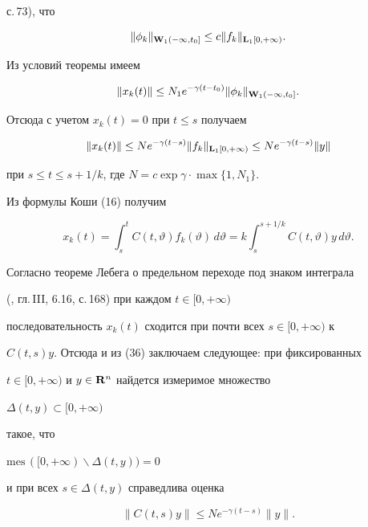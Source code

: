 с.\,73), что


$$


\|\phi_k\|_{\bold W_1(-\infty,t_0]}\le c\|f_k\|_{\bold L_1[0,+\infty)}.


$$


Из условий теоремы имеем


$$


\|x_k(t)\|\le


N_1e^{-\gamma(t-t_0)}\|\phi_k\|_{\bold W_1(-\infty,t_0]}.


$$


Отсюда с учетом $x_k(t)=0$ при $t\le s$ получаем


%


\begin{equation}


\|x_k(t)\|\le Ne^{-\gamma(t-s)}\|f_k\|_{\bold L_1[0,+\infty)}\le


Ne^{-\gamma(t-s)}\|y\|


\end{equation}


%


при $s\le t\le s+1/k$, где $N=c\exp\gamma\cdot\max\{1,N_1\}$.





Из формулы Коши (16) получим


$$


x_k(t)=\int_s^tC(t,\vartheta)f_k(\vartheta)\,d\vartheta=


k\int_s^{s+1/k}C(t,\vartheta)y\,d\vartheta.


$$


Согласно теореме Лебега о предельном переходе под знаком интеграла


(\cite{Dun}, гл.\,III, 6.16, с.\,168) при каждом $t\in[0,+\infty)$


последовательность $x_k(t)$ сходится при почти всех $s\in[0,+\infty)$ к


$C(t,s)y$. Отсюда и из (36) заключаем следующее: при фиксированных


$t\in[0,+\infty)$ и $y\in\bold R^n$ найдется измеримое множество


$\Delta(t,y)\subset[0,+\infty)$


такое, что


$\mathrm{mes}\,([0,+\infty)\backslash\Delta(t,y))=0$


и при всех $s\in\Delta(t,y)$ справедлива оценка


%


\begin{equation}


\|C(t,s)y\|\le Ne^{-\gamma(t-s)}\|y\|.


\end{equation}


